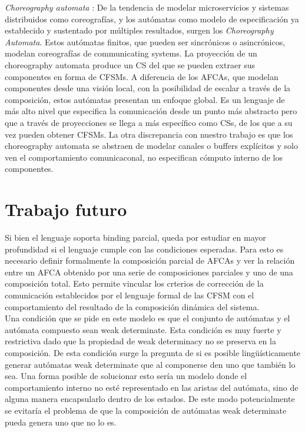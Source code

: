 \emph{Choreography automata} \cite{barbanera:coordination20}: De la tendencia de modelar microservicios y sistemas distribuidos como coreografías, y los autómatas como modelo de especificación ya establecido y sustentado por múltiples resultados, surgen los \emph{Choreography Automata}. Estos autómatas finitos, que pueden ser sincrónicos o asincrónicos, modelan coreografías de communicating systems. La proyección de un choreography automata produce un CS del que se pueden extraer sus componentes en forma de CFSMs. A diferencia de los AFCAs, que modelan componentes desde una visión local, con la posibilidad de escalar a través de la composición,  estos autómatas presentan un enfoque global. Es un lenguaje de más alto nivel que especifica la comunicación desde un punto más abstracto pero que a través de proyecciones se llega a más específico como CSs, de los que a su vez pueden obtener CFSMs. La otra discrepancia con nuestro trabajo es que los choreography automata se abstraen de modelar canales o buffers explícitos y solo ven el comportamiento comunicaconal, no especifican cómputo interno de los componentes.

\section{Trabajo futuro}
Si bien el lenguaje soporta binding parcial, queda por estudiar en mayor profundidad si el lenguaje cumple con las condiciones esperadas. Para esto es necesario definir formalmente la composición parcial de AFCAs y ver la relación entre un AFCA obtenido por una serie de composiciones parciales y uno de una composición total. Esto permite vincular los crterios de corrección de la comunicación establecidos por el lenguaje formal de las CFSM con el comportamiento del resultado de la composición dinámica del sistema. \\
Una condición que se pide en este modelo es que el conjunto de autómatas y el autómata compuesto sean weak determinate. Esta condición es muy fuerte y restrictiva dado que la propiedad de weak determinacy no se preserva en la composición. De esta condición surge la pregunta de si es posible lingüísticamente generar autómatas weak determinate que al componerse den uno que también lo sea. Una forma posible de solucionar esto sería un modelo donde el comportamiento interno no esté representado en las aristas del autómata, sino de alguna manera encapsularlo dentro de los estados. De este modo potencialmente se evitaría el problema de que la composición de autómatas weak determinate pueda genera uno que no lo es.


